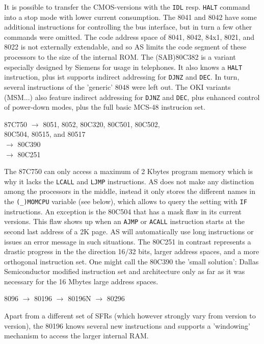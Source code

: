 \documentclass[12pt,twoside]{report}
\newcommand{\tty}[1]{{\tt #1}}
\newcommand{\asname}{{AS}}
\newcommand{\predefsym}[1]{{\tt (\_)#1}}
\begin{document}
It is possible to transfer the CMOS-versions with the \tty{IDL} resp.
\tty{HALT} command into a stop mode with lower current consumption.
The 8041 and 8042 have some additional instructions for controlling the
bus interface, but in turn a few other commands were omitted.
The code address space of 8041, 8042, 84x1, 8021, and 8022 is not externally
extendable, and so \asname{} limits the code segment of these processors to
the size of the internal ROM.  The (SAB)80C382 is a variant especially
designed by Siemens for usage in telephones.  It also knows a
\tty{HALT} instruction, plus ist supports indirect addressing for
\tty{DJNZ} and \tty{DEC}.  In turn, several instructions of the
'generic' 8048 were left out.  The OKI variants (MSM...) also
feature indirect addressing for \tty{DJNZ} and \tty{DEC}, plus
enhanced control of power-down modes, plus the full basic MCS-48
instrucion set.
\begin{cpulist}
   87C750 $\rightarrow$ 8051, 8052, 80C320, 80C501, 80C502, \\
\> 80C504, 80515, and 80517 \\
\> $\rightarrow$ 80C390 \\
\> $\rightarrow$ 80C251
\end{cpulist}
The 87C750 can only access a maximum of 2 Kbytes program memory which is
why it lacks the \tty{LCALL} and \tty{LJMP} instructions.  \asname{} does not
make any distinction among the processors in the middle, instead it only
stores the different names in the \predefsym{MOMCPU} variable (see below), which
allows to query the setting with \tty{IF} instructions.  An exception is
the 80C504 that has a mask flaw in its current versions.  This flaw shows
up when an \tty{AJMP} or \tty{ACALL} instruction starts at the second last
address of a 2K page.  \asname{} will automatically use long instructions or
issues an error message in such situations.  The 80C251 in contrast
represents a drastic progress in the the direction 16/32 bits, larger
address spaces, and a more orthogonal instruction set.  One might call the
80C390 the 'small solution': Dallas Semiconductor modified instruction set
and architecture only as far as it was necessary for the 16 Mbytes large
address spaces.
\begin{cpulist}
   8096 $\rightarrow$ 80196 $\rightarrow$ 80196N $\rightarrow$ 80296
\end{cpulist}
Apart from a different set of SFRs (which however strongly vary from
version to version), the 80196 knows several new instructions and
supports a 'windowing' mechanism to access the larger internal RAM.
\end{document}
